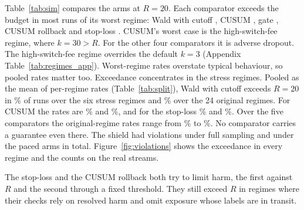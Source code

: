 \documentclass[10pt]{article}
\theoremstyle{plain}
\theoremstyle{definition}
\begin{document}
\begin{table}[!htbp]
\caption{Registered confirmation C1--C6 (simulation, \NRunsPerArm{} runs per arm). C4 compares the $R=20$ shield with Wald using a 3\% cost tolerance and with never switching using a zero-cost tolerance.}\label{tab:confirm}
\centering\small
\resizebox{\linewidth}{!}{}
\end{table}

Table~\ref{tab:sim} compares the arms at $R=20$. Each comparator exceeds the budget in most runs of its worst regime: Wald with cutoff \WorstWald, CUSUM \WorstCusum, gate \WorstGate, CUSUM rollback \WorstCusumRb{} and stop-loss \WorstStop. CUSUM's worst case is the high-switch-fee regime, where $k=30>R$. For the other four comparators it is adverse dropout. The high-switch-fee regime overrides the default $k=3$ (Appendix Table~\ref{tab:regimes_app}).
Worst-regime rates overstate typical behaviour, so pooled rates matter too. Exceedance concentrates in the stress regimes. Pooled as the mean of per-regime rates (Table~\ref{tab:split}), Wald with cutoff exceeds $R=20$ in \StressExceedWald\% of runs over the six stress regimes and \OrigExceedWald\% over the 24 original regimes. For CUSUM the rates are \StressExceedCusum\% and \OrigExceedCusum\%, and for the stop-loss \StressExceedStop\% and \OrigExceedStop\%. Over the five comparators the original-regime rates range from \OrigExceedMin\% to \OrigExceedMax\%. No comparator carries a guarantee even there. The shield had \COneTotal{} violations under full sampling and \CTwoTotal{} under the paced arms in total. Figure~\ref{fig:violations} shows the exceedance in every regime and the counts on the real streams.



The stop-loss and the CUSUM rollback both try to limit harm, the first against $R$ and the second through a fixed threshold. They still exceed $R$ in regimes where their checks rely on resolved harm and omit exposure whose labels are in transit.

\begin{table}[!htbp]
\caption{Ablations at $R=12$ (registered C6): worst-regime violation rate with the Wilson 95\% interval.}\label{tab:ablation}
\centering\small

\end{table}
\end{document}
